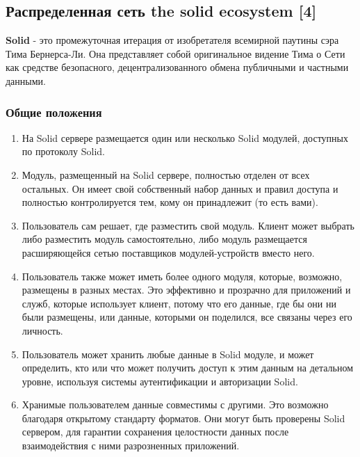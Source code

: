 \hypertarget{ux440ux430ux441ux43fux440ux435ux434ux435ux43bux435ux43dux43dux430ux44f-ux441ux435ux442ux44c-the-solid-ecosystem-4}{%
\subsection{Распределенная сеть the solid ecosystem
{[}4{]}}\label{ux440ux430ux441ux43fux440ux435ux434ux435ux43bux435ux43dux43dux430ux44f-ux441ux435ux442ux44c-the-solid-ecosystem-4}}

\textbf{Solid} - это промежуточная итерация от изобретателя всемирной
паутины сэра Тима Бернерса-Ли. Она представляет собой оригинальное
видение Тима о Сети как средстве безопасного, децентрализованного обмена
публичными и частными данными.

\hypertarget{ux43eux431ux449ux438ux435-ux43fux43eux43bux43eux436ux435ux43dux438ux44f}{%
\subsubsection{Общие
положения}\label{ux43eux431ux449ux438ux435-ux43fux43eux43bux43eux436ux435ux43dux438ux44f}}

\begin{enumerate}
\def\labelenumi{\arabic{enumi}.}
\tightlist
\item
  На Solid сервере размещается один или несколько Solid модулей,
  доступных по протоколу Solid.
\item
  Модуль, размещенный на Solid сервере, полностью отделен от всех
  остальных. Он имеет свой собственный набор данных и правил доступа и
  полностью контролируется тем, кому он принадлежит (то есть вами).
\item
  Пользователь сам решает, где разместить свой модуль. Клиент может
  выбрать либо разместить модуль самостоятельно, либо модуль размещается
  расширяющейся сетью поставщиков модулей-устройств вместо него.
\item
  Пользователь также может иметь более одного модуля, которые, возможно,
  размещены в разных местах. Это эффективно и прозрачно для приложений и
  служб, которые использует клиент, потому что его данные, где бы они ни
  были размещены, или данные, которыми он поделился, все связаны через
  его личность.
\item
  Пользователь может хранить любые данные в Solid модуле, и может
  определить, кто или что может получить доступ к этим данным на
  детальном уровне, используя системы аутентификации и авторизации
  Solid.
\item
  Хранимые пользователем данные совместимы с другими. Это возможно
  благодаря открытому стандарту форматов. Они могут быть проверены Solid
  сервером, для гарантии сохранения целостности данных после
  взаимодействия с ними разрозненных приложений.
\end{enumerate}

